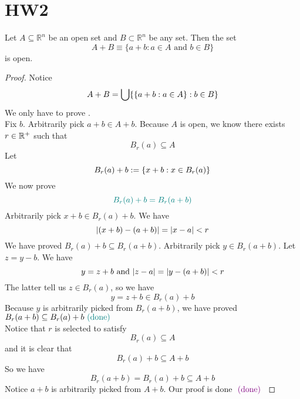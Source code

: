 \documentclass{report}
\begin{document}
\section{HW2}
\begin{question}{}{}

Let \(A \subseteq \mathbb{R}^n\) be an open set and \(B \subset \mathbb{R}^n\) be any set. Then the set 
\[ A + B \equiv \{a + b : a \in A \text{ and } b \in B\} \]
is open.
\end{question}
\begin{proof}
Notice 
\begin{equation}
A+B= \bigcup \{ \{ a+b:a\in A \}:b\in B \}
\end{equation}
We only have to prove  .\\

Fix $b$. Arbitrarily pick $a+b\in A+b$. Because $A$ is open, we know there exists $r\in\mathbb{R}^+$ such that
\begin{equation}
B_r(a)\subseteq A
\end{equation}
Let
\begin{equation}
B_r(a)+b:=\{ x+b:x\in B_r(a) \}
\end{equation}
We now prove 
\begin{equation}
\textcolor{teal}{B_r(a)+b=B_r(a+b)}
\end{equation}
Arbitrarily pick $x+b\in B_r(a)+b$. We have
\begin{equation}
|(x+b)-(a+b)|=|x-a|<r
\end{equation}
We have proved $B_r(a)+b\subseteq B_r(a+b)$. Arbitrarily pick $y\in B_r(a+b)$. Let $z=y-b$. We have
\begin{equation}
y=z+b\text{ and }|z-a|=|y-(a+b)|<r
\end{equation}
The latter tell us $z \in B_r(a)$, so we have
\begin{equation}
y=z+b \in B_r(a)+b
\end{equation}
Because $y$ is arbitrarily picked from $B_r(a+b)$, we have proved $B_r(a+b)\subseteq B_r(a)+b\textcolor{teal}{\text{ (done) }}$\\

Notice that  $r$ is selected to satisfy
\begin{equation}
B_r(a)\subseteq A
\end{equation}
and it is clear that
\begin{equation}
B_r(a)+b\subseteq A+b
\end{equation}
So we have
\begin{equation}
B_r(a+b)=B_r(a)+b\subseteq A+b
\end{equation}
Notice $a+b$ is arbitrarily picked from $A+b$. Our proof is done  $\textcolor{violet}{\text{ (done) }}$
\end{proof}
\end{document}
